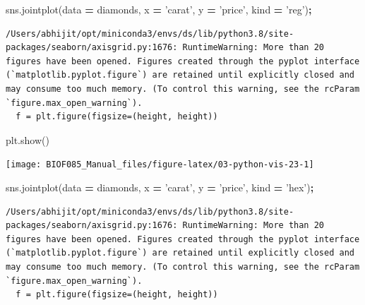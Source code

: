 \documentclass[
  letterpaper,
]{scrbook}
\newenvironment{Shaded}{\begin{snugshade}}{\end{snugshade}}
\newcommand{\NormalTok}[1]{#1}
\newcommand{\OperatorTok}[1]{\textcolor[rgb]{0.81,0.36,0.00}{\textbf{#1}}}
\newcommand{\StringTok}[1]{\textcolor[rgb]{0.31,0.60,0.02}{#1}}
\begin{document}
\begin{Shaded}
\begin{Highlighting}[]
\NormalTok{sns.jointplot(data }\OperatorTok{=}\NormalTok{ diamonds, x }\OperatorTok{=} \StringTok{'carat'}\NormalTok{, y }\OperatorTok{=} \StringTok{'price'}\NormalTok{, kind }\OperatorTok{=} \StringTok{'reg'}\NormalTok{)}\OperatorTok{;}
\end{Highlighting}
\end{Shaded}

\begin{verbatim}
/Users/abhijit/opt/miniconda3/envs/ds/lib/python3.8/site-packages/seaborn/axisgrid.py:1676: RuntimeWarning: More than 20 figures have been opened. Figures created through the pyplot interface (`matplotlib.pyplot.figure`) are retained until explicitly closed and may consume too much memory. (To control this warning, see the rcParam `figure.max_open_warning`).
  f = plt.figure(figsize=(height, height))
\end{verbatim}

\begin{Shaded}
\begin{Highlighting}[]
\NormalTok{plt.show()}
\end{Highlighting}
\end{Shaded}

\begin{center}\texttt{[image: BIOF085\_Manual\_files/figure-latex/03-python-vis-23-1]} \end{center}

\begin{Shaded}
\begin{Highlighting}[]
\NormalTok{sns.jointplot(data }\OperatorTok{=}\NormalTok{ diamonds, x }\OperatorTok{=} \StringTok{'carat'}\NormalTok{, y }\OperatorTok{=} \StringTok{'price'}\NormalTok{, kind }\OperatorTok{=} \StringTok{'hex'}\NormalTok{)}\OperatorTok{;}
\end{Highlighting}
\end{Shaded}

\begin{verbatim}
/Users/abhijit/opt/miniconda3/envs/ds/lib/python3.8/site-packages/seaborn/axisgrid.py:1676: RuntimeWarning: More than 20 figures have been opened. Figures created through the pyplot interface (`matplotlib.pyplot.figure`) are retained until explicitly closed and may consume too much memory. (To control this warning, see the rcParam `figure.max_open_warning`).
  f = plt.figure(figsize=(height, height))
\end{verbatim}
\end{document}
